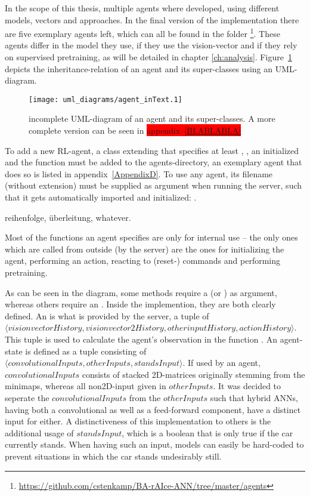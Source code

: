 In the scope of this thesis, multiple agents where developed, using different models, vectors and approaches. In the final version of the implementation there are five exemplary agents left, which can all be found in the folder \footnote{\url{https://github.com/cstenkamp/BA-rAIce-ANN/tree/master/agents}}. These agents differ in the model they use, if they use the vision-vector and if they rely on supervised pretraining, as will be detailed in chapter \ref{ch:analysis}. %
Figure~\ref{fig:agentMINI} depicts the inheritance-relation of an agent and its super-classes using an UML-diagram.
\begin{figure}[h]
	\centering 
	\texttt{[image: uml\_diagrams/agent\_inText.1]}  
	\caption[UML-diagram of an agent and its super-classes]{incomplete UML-diagram of an agent and its super-classes. A more complete version can be seen in \colorbox{red}{appendix~\ref{BLABLABLA}}}
	\label{fig:agentMINI}
\end{figure}

To add a new RL-agent, a class extending  that specifies at least , , an initialized  and the function  must be added to the agents-directory, an exemplary agent that does so is listed in appendix~\ref{AppendixD}. To use any agent, its filename (without extension) must be supplied as argument when running the server, such that it gets automatically imported and initialized: .

reihenfolge, überleitung, whatever.


Most of the functions an agent specifies are only for internal use -- the only ones which are called from outside (by the server) are the ones for initializing the agent, performing an action, reacting to (reset-) commands and performing pretraining.

As can be seen in the diagram, some methods require a  (or ) as argument, whereas others require an . Inside the implemention, they are both clearly defined. An  is what is provided by the server, a tuple of $\langle visionvectorHistory, visionvector2History, otherinputHistory, actionHistory \rangle$. This tuple is used to calculate the agent's observation in the function . An agent-state is defined as a tuple consisting of $\langle convolutionalInputs, otherInputs, standsInput \rangle$. If used by an agent, $convolutionalInputs$ consists of stacked 2D-matrices originally stemming from the minimaps, whereas all non2D-input given in $otherInputs$. It was decided to seperate the $convolutionalInputs$ from the $otherInputs$ such that hybrid ANNs, having both a convolutional as well as a feed-forward component, have a distinct input for either. A distinctiveness of this implementation to others is the additional usage of $standsInput$, which is a boolean that is only true if the car currently stands. When having such an input, models can easily be hard-coded to prevent situations in which the car stands undesirably still. 

